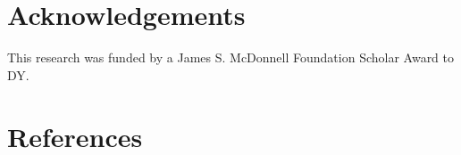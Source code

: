 \documentclass[10pt, letterpaper]{article}
\begin{document}
\vspace{1em} 

\hypertarget{acknowledgements}{%
\section{Acknowledgements}\label{acknowledgements}}

This research was funded by a James S. McDonnell Foundation Scholar
Award to DY.

\hypertarget{references}{%
\section{References}\label{references}}

\setlength{\parindent}{-0.1in}
\setlength{\leftskip}{0.125in}

\noindent
\end{document}
